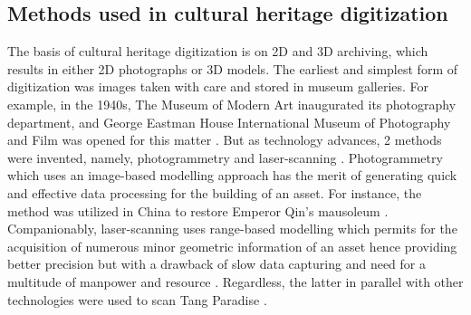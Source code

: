 \documentclass[conference]{IEEEtran}
\begin{document}
\subsection{\textbf{Methods used in cultural heritage digitization}}

The basis of cultural heritage digitization is on 2D and 3D archiving, which results in either 2D photographs or 3D models. The earliest and simplest form of digitization was images taken with care and stored in museum galleries. For example, in the 1940s, The Museum of Modern Art inaugurated its photography department, and George Eastman House International Museum of Photography and Film was opened for this matter \cite{Note2011}. But as technology advances, 2 methods were invented, namely, photogrammetry and laser-scanning \cite{dgpht}. Photogrammetry which uses an image-based modelling approach has the merit of generating quick and effective data processing for the building of an asset. For instance, the method was utilized in China to restore Emperor Qin’s mausoleum \cite{Zhou2012}. Companionably, laser-scanning uses range-based modelling which permits for the acquisition of numerous minor geometric information of an asset hence providing better precision \cite{dgpht} but with a drawback of slow data capturing and need for a multitude of manpower and resource \cite{Zhou2012}. Regardless, the latter in parallel with other technologies were used to scan Tang Paradise \cite{dgpht}. \\
\end{document}
